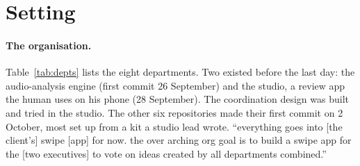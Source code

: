 \documentclass[11pt]{article}
\begin{document}
\section{Setting}\label{sec:setting}

\paragraph{The organisation.}
Table~\ref{tab:depts} lists the eight departments. Two existed before the last day: the %
audio-analysis engine (first commit 26 September) and the studio, a review app the human %
uses on his phone (28 September). The coordination design was built and tried in the %
studio. The other six repositories made their first commit on 2 October, most set up %
from a kit a studio lead wrote. %
``everything goes into [the client's] swipe [app] for now. the over arching org goal is
to build a swipe app for the [two executives] to vote on ideas created by all departments
combined.''
\end{document}

